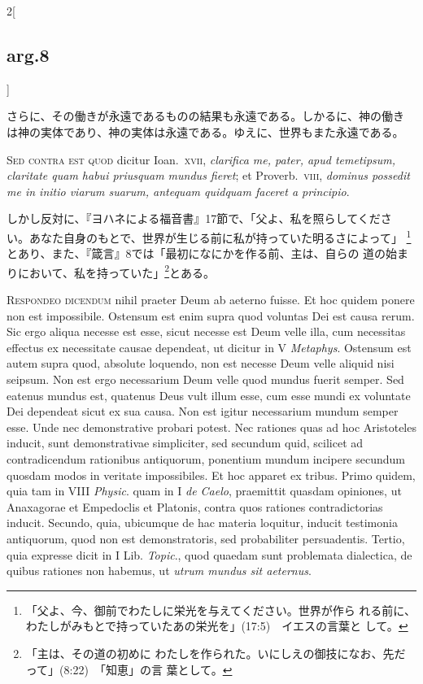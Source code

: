 \documentclass[paper=a4paper,fontsize=10pt,jafontsize=9pt,titlepage]{jlreq}
\begin{document}
\begin{paracol}{2}[\subsection{arg.8}]
\switchcolumn


さらに、その働きが永遠であるものの結果も永遠である。しかるに、神の働き
は神の実体であり、神の実体は永遠である。ゆえに、世界もまた永遠である。


\switchcolumn*[\subsection{s.c.}]


{\scshape Sed contra est quod} dicitur Ioan.~{\scshape xvii}, {\itshape clarifica me,
 pater, apud temetipsum, claritate quam habui priusquam mundus fieret};
 et Proverb.~{\scshape viii}, {\itshape dominus possedit me in initio viarum
 suarum, antequam quidquam faceret a principio}.


\switchcolumn


しかし反対に、『ヨハネによる福音書』17節で、「父よ、私を照らしてくださ
い。あなた自身のもとで、世界が生じる前に私が持っていた明るさによって」
\footnote {「父よ、今、御前でわたしに栄光を与えてください。世界が作ら
れる前に、わたしがみもとで持っていたあの栄光を」(17:5)　イエスの言葉と
して。}とあり、また、『箴言』8では「最初になにかを作る前、主は、自らの
道の始まりにおいて、私を持っていた」\footnote {「主は、その道の初めに
わたしを作られた。いにしえの御技になお、先だって」(8:22)　「知恵」の言
葉として。}とある。




{\scshape Respondeo dicendum} nihil praeter Deum ab aeterno fuisse. Et hoc
 quidem ponere non est impossibile. Ostensum est enim supra quod
 voluntas Dei est causa rerum. Sic ergo aliqua necesse est esse, sicut
 necesse est Deum velle illa, cum necessitas effectus ex necessitate
 causae dependeat, ut dicitur in V {\itshape Metaphys}. Ostensum est autem
 supra quod, absolute loquendo, non est necesse Deum velle aliquid nisi
 seipsum. Non est ergo necessarium Deum velle quod mundus fuerit
 semper. Sed eatenus mundus est, quatenus Deus vult illum esse, cum esse
 mundi ex voluntate Dei dependeat sicut ex sua causa. Non est igitur
 necessarium mundum semper esse. Unde nec demonstrative probari
 potest. Nec rationes quas ad hoc Aristoteles inducit, sunt
 demonstrativae simpliciter, sed secundum quid, scilicet ad
 contradicendum rationibus antiquorum, ponentium mundum incipere
 secundum quosdam modos in veritate impossibiles. Et hoc apparet ex
 tribus. Primo quidem, quia tam in VIII {\itshape Physic}. quam in I {\itshape de
 Caelo}, praemittit quasdam opiniones, ut Anaxagorae et Empedoclis et
 Platonis, contra quos rationes contradictorias inducit. Secundo, quia,
 ubicumque de hac materia loquitur, inducit testimonia antiquorum, quod
 non est demonstratoris, sed probabiliter persuadentis. Tertio, quia
 expresse dicit in I Lib. {\itshape Topic}., quod quaedam sunt problemata
 dialectica, de quibus rationes non habemus, ut {\itshape utrum mundus sit
 aeternus}.



\end{paracol}
\end{document}
